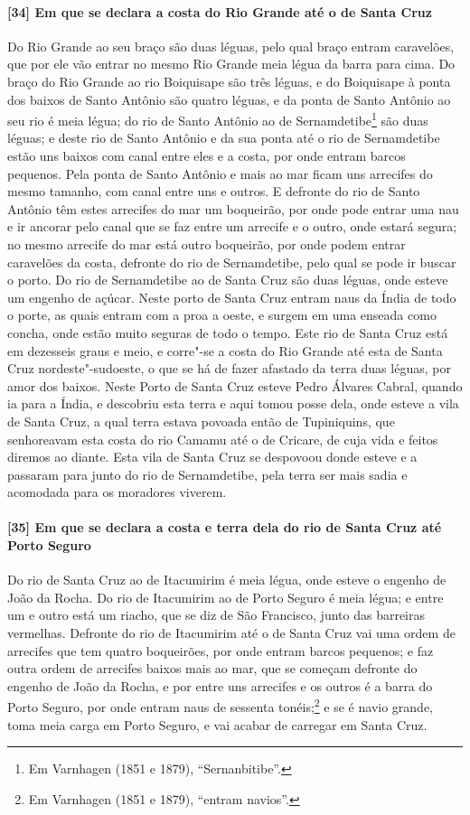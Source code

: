 \begin{linenumbers}
\paragraph{[34] Em que se declara a costa do Rio Grande até o de Santa Cruz} \quad
Do Rio Grande ao seu braço são duas léguas, pelo qual braço entram caravelões, que por ele
vão entrar no mesmo Rio Grande meia légua da barra para cima. Do braço do Rio Grande ao
rio Boiquisape são três léguas, e do Boiquisape à ponta dos baixos de Santo Antônio são
quatro léguas, e da ponta de Santo Antônio ao seu rio é meia légua; do rio de Santo
Antônio ao de Sernamdetibe\footnote{ Em Varnhagen (1851 e 1879), ``Sernanbitibe''.} são
duas léguas; e deste rio de Santo Antônio e da sua ponta até o rio de Sernamdetibe estão
uns baixos com canal entre eles e a costa, por onde entram barcos pequenos. Pela ponta de
Santo Antônio e mais ao mar ficam uns arrecifes do mesmo tamanho, com canal entre uns e
outros. E defronte do rio de Santo Antônio têm estes arrecifes do mar um boqueirão, por
onde pode entrar uma nau e ir ancorar pelo canal que se faz entre um arrecife e o outro,
onde estará segura; no mesmo arrecife do mar está outro boqueirão, por onde podem entrar
caravelões da costa, defronte do rio de Sernamdetibe, pelo qual se pode ir buscar o porto.
Do rio de Sernamdetibe ao de Santa Cruz são duas léguas, onde esteve um engenho de açúcar.
Neste porto de Santa Cruz entram naus da Índia de todo o porte, as quais entram com a proa
a oeste, e surgem em uma enseada como concha, onde estão muito seguras de todo o tempo.
Este rio de Santa Cruz está em dezesseis graus e meio, e corre"-se a costa do Rio Grande
até esta de Santa Cruz nordeste"-sudoeste, o que se há de fazer afastado da terra duas
léguas, por amor dos baixos. Neste Porto de Santa Cruz esteve Pedro Álvares Cabral, quando
ia para a Índia, e descobriu esta terra e aqui tomou posse dela, onde esteve a vila de
Santa Cruz, a qual terra estava povoada então de Tupiniquins, que senhoreavam esta costa
do rio Camamu até o de Cricare, de cuja vida e feitos diremos ao diante. Esta vila de
Santa Cruz se despovoou donde esteve e a passaram para junto do rio de Sernamdetibe, pela
terra ser mais sadia e acomodada para os moradores viverem.

\paragraph{[35] Em que se declara a costa e terra dela do rio de Santa Cruz até Porto
Seguro} \quad
Do rio de Santa Cruz ao de Itacumirim é meia légua, onde esteve o engenho de João da
Rocha. Do rio de Itacumirim ao de Porto Seguro é meia légua; e entre um e outro está um
riacho, que se diz de São Francisco, junto das barreiras vermelhas. Defronte do rio de
Itacumirim até o de Santa Cruz vai uma ordem de arrecifes que tem quatro boqueirões, por
onde entram barcos pequenos; e faz outra ordem de arrecifes baixos mais ao mar, que se
começam defronte do engenho de João da Rocha, e por entre uns arrecifes e os outros é a
barra do Porto Seguro, por onde entram naus de sessenta tonéis;\footnote{ Em Varnhagen
(1851 e 1879), ``entram navios''.} e se é navio grande, toma meia carga em Porto Seguro, e
vai acabar de carregar em Santa Cruz.


\end{linenumbers}
